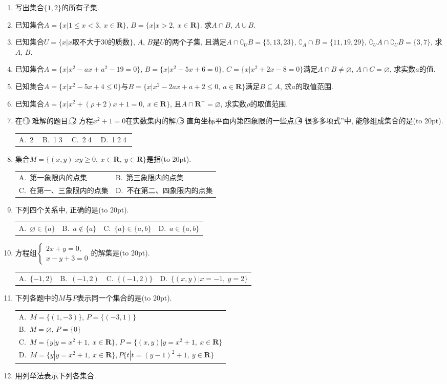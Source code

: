 \documentclass[10pt,a4paper]{article}
\newcommand{\bracket}[1]{(\hbox to #1pt{})}
\newcommand{\onech}[4]{\par\begin{tabular}{p{.9\textwidth}}
A.~#1\\
B.~#2\\
C.~#3\\
D.~#4
\end{tabular}}
\newcommand{\twoch}[4]{\par\begin{tabular}{p{.46\textwidth}p{.46\textwidth}}
A.~#1& B.~#2\\
C.~#3& D.~#4
\end{tabular}}
\newcommand{\fourch}[4]{\par\begin{tabular}{p{.23\textwidth}p{.23\textwidth}p{.23\textwidth}p{.23\textwidth}}
A.~#1 &B.~#2& C.~#3& D.~#4
\end{tabular}}
\begin{document}
\begin{enumerate}[1.]

\item 写出集合$\{1,2\}$的所有子集.
\item 已知集合$A=\{x|1 \le x<3,\ x\in \mathbf{R}\}$, $B=\{x|x>2,\ x\in \mathbf{R}\}$. 求$A\cap B$, $A\cup B$.
\item 已知集合$U =\{x|x\text{取不大于}30\text{的质数}\}$, $A$, $B$是$U$的两个子集, 且满足$A\cap \complement_UB=\{5,13,23\}$, $\complement_A\cap B=\{11,19,29\}$, $\complement_UA\cap \complement_UB=\{3,7\}$, 求$A$, $B$.
\item 已知集合$A=\{x|x^2- ax+a^2-19=0\}$, $B=\{x|x^2-5x+6=0\}$, $C=\{ x|x^2+2x-8=0\}$满足$A\cap B\ne \varnothing$, $A\cap C=\varnothing$, 求实数$a$的值.
\item 已知集合$A=\{x|x^2-5x+4\le 0\}$与$B=\{x|x^2-2ax+a+2\le 0,\ a\in \mathbf{R}\}$满足$B\subseteq A$, 求$a$的取值范围.
\item 已知集合$A=\{x|x^2 +(\rho +2)x+1=0, \ x\in \mathbf{R}\}$, 且$A\cap \mathbf{R}^+=\varnothing$, 求实数$\rho$的取值范围.
\item 在``\textcircled{1} 难解的题目, \textcircled{2} 方程$x^2+1=0$在实数集内的解, \textcircled{3} 直角坐标平面内第四象限的一些点, \textcircled{4} 很多多项式''中, 能够组成集合的是\bracket{20}.
\fourch{\textcircled{2}}{\textcircled{1}\textcircled{3}}{\textcircled{2}\textcircled{4}}{\textcircled{1}\textcircled{2}\textcircled{4}}
\item 集合$M=\{(x,y)|xy\ge 0,\ x\in \mathbf{R},\ y\in \mathbf{R}\}$是指\bracket{20}.
\twoch{第一象限内的点集}{第三象限内的点集}{在第一、三象限内的点集}{不在第二、四象限内的点集}
\item 下列四个关系中, 正确的是\bracket{20}.
\fourch{$\varnothing \in \{a\}$}{$a\notin \{a\}$}{$\{a\}\in \{a,b\}$}{$a\in \{a,b\}$}
\item 方程组$\begin{cases} 2x+y=0, \\ x-y+3=0 \end{cases}$的解集是\bracket{20}.
\fourch{$\{-1,2\}$}{$(-1,2)$}{$\{(-1,2)\}$}{$\{(x,y)|x=-1, \ y=2\}$}
\item 下列各题中的$M$与$P$表示同一个集合的是\bracket{20}.
\onech{$M=\{(1,-3)\}$, $P=\{(-3,1)\}$}{$M=\varnothing$, $P=\{0\}$}{$M=\{y|y=x^2+1, \ x\in \mathbf{R}\}$, $P=\{(x,y)|y=x^2+1, \ x\in \mathbf{R}\}$}{$M=\{y|y=x^2+1,\ x\in \mathbf{R}\},P\{t|t=(y-1)^2+1, \ y\in \mathbf{R}\}$}
\item 用列举法表示下列各集合.\\

\end{enumerate}
\end{document}
